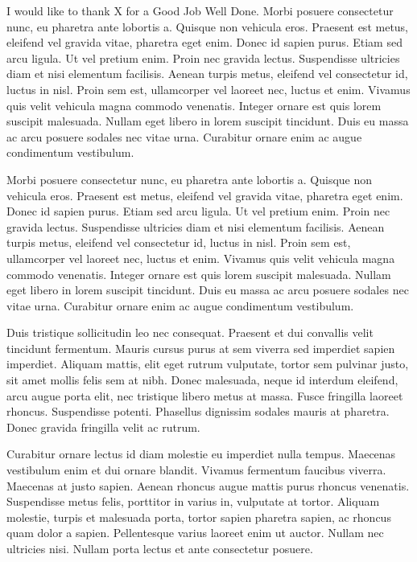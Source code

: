 % 

\Agradecimientos
\noindent
I would like to thank X for a Good Job Well Done. Morbi posuere consectetur nunc, eu pharetra ante lobortis a. Quisque non vehicula eros. Praesent est metus, eleifend vel gravida vitae, pharetra eget enim. Donec id sapien purus. Etiam sed arcu ligula. Ut vel pretium enim. Proin nec gravida lectus. Suspendisse ultricies diam et nisi elementum facilisis. Aenean turpis metus, eleifend vel consectetur id, luctus in nisl. Proin sem est, ullamcorper vel laoreet nec, luctus et enim. Vivamus quis velit vehicula magna commodo venenatis. Integer ornare est quis lorem suscipit malesuada. Nullam eget libero in lorem suscipit tincidunt. Duis eu massa ac arcu posuere sodales nec vitae urna. Curabitur ornare enim ac augue condimentum vestibulum.

Morbi posuere consectetur nunc, eu pharetra ante lobortis a. Quisque non vehicula eros. Praesent est metus, eleifend vel gravida vitae, pharetra eget enim. Donec id sapien purus. Etiam sed arcu ligula. Ut vel pretium enim. Proin nec gravida lectus. Suspendisse ultricies diam et nisi elementum facilisis. Aenean turpis metus, eleifend vel consectetur id, luctus in nisl. Proin sem est, ullamcorper vel laoreet nec, luctus et enim. Vivamus quis velit vehicula magna commodo venenatis. Integer ornare est quis lorem suscipit malesuada. Nullam eget libero in lorem suscipit tincidunt. Duis eu massa ac arcu posuere sodales nec vitae urna. Curabitur ornare enim ac augue condimentum vestibulum.

Duis tristique sollicitudin leo nec consequat. Praesent et dui convallis velit tincidunt fermentum. Mauris cursus purus at sem viverra sed imperdiet sapien imperdiet. Aliquam mattis, elit eget rutrum vulputate, tortor sem pulvinar justo, sit amet mollis felis sem at nibh. Donec malesuada, neque id interdum eleifend, arcu augue porta elit, nec tristique libero metus at massa. Fusce fringilla laoreet rhoncus. Suspendisse potenti. Phasellus dignissim sodales mauris at pharetra. Donec gravida fringilla velit ac rutrum.

Curabitur ornare lectus id diam molestie eu imperdiet nulla tempus. Maecenas vestibulum enim et dui ornare blandit. Vivamus fermentum faucibus viverra. Maecenas at justo sapien. Aenean rhoncus augue mattis purus rhoncus venenatis. Suspendisse metus felis, porttitor in varius in, vulputate at tortor. Aliquam molestie, turpis et malesuada porta, tortor sapien pharetra sapien, ac rhoncus quam dolor a sapien. Pellentesque varius laoreet enim ut auctor. Nullam nec ultricies nisi. Nullam porta lectus et ante consectetur posuere.

